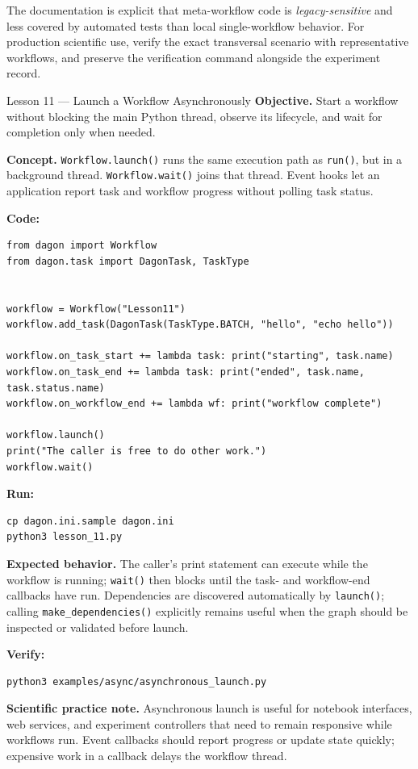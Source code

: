 \begin{cautionbox}
The documentation is explicit that meta-workflow code is \emph{legacy-sensitive}
and less covered by automated tests than local single-workflow behavior. For
production scientific use, verify the exact transversal scenario with
representative workflows, and preserve the verification command alongside
the experiment record.
\end{cautionbox}

\begin{lessonbox}{Lesson 11 --- Launch a Workflow Asynchronously}
\textbf{Objective.} Start a workflow without blocking the main Python thread,
observe its lifecycle, and wait for completion only when needed.

\textbf{Concept.} \texttt{Workflow.launch()} runs the same execution path as
\texttt{run()}, but in a background thread. \texttt{Workflow.wait()} joins
that thread. Event hooks let an application report task and workflow
progress without polling task status.

\textbf{Code:}
\begin{lstlisting}
from dagon import Workflow
from dagon.task import DagonTask, TaskType


workflow = Workflow("Lesson11")
workflow.add_task(DagonTask(TaskType.BATCH, "hello", "echo hello"))

workflow.on_task_start += lambda task: print("starting", task.name)
workflow.on_task_end += lambda task: print("ended", task.name, task.status.name)
workflow.on_workflow_end += lambda wf: print("workflow complete")

workflow.launch()
print("The caller is free to do other work.")
workflow.wait()
\end{lstlisting}

\textbf{Run:}
\begin{lstlisting}[style=bash]
cp dagon.ini.sample dagon.ini
python3 lesson_11.py
\end{lstlisting}

\textbf{Expected behavior.} The caller's print statement can execute while
the workflow is running; \texttt{wait()} then blocks until the task- and
workflow-end callbacks have run. Dependencies are discovered automatically by
\texttt{launch()}; calling \texttt{make\_dependencies()} explicitly remains
useful when the graph should be inspected or validated before launch.

\textbf{Verify:}
\begin{lstlisting}[style=bash]
python3 examples/async/asynchronous_launch.py
\end{lstlisting}

\textbf{Scientific practice note.} Asynchronous launch is useful for notebook
interfaces, web services, and experiment controllers that need to remain
responsive while workflows run. Event callbacks should report progress or
update state quickly; expensive work in a callback delays the workflow
thread.
\end{lessonbox}

